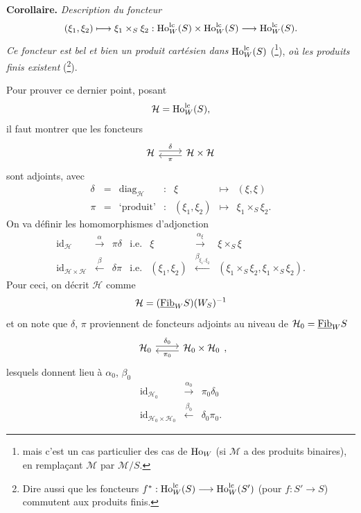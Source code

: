 \textbf{Corollaire.} {\itshape Description du foncteur
\[
(\xi_1,\xi_2)\longmapsto\xi_1\times_S\xi_2 : \mathrm{Ho}^{\mathrm{lc}}_W(S)\times\mathrm{Ho}^{\mathrm{lc}}_W(S)\longrightarrow\mathrm{Ho}^{\mathrm{lc}}_W(S).
\]
Ce foncteur est bel et bien un produit cartésien dans} $\mathrm{Ho}^{\mathrm{lc}}_W(S)$ (\footnote{mais c'est un cas particulier des cas de $\mathrm{Ho}_W$ (si $\mathcal{M}$ a des produits binaires), en remplaçant $\mathcal{M}$ par $\mathcal{M}/S$.}), {\itshape où les produits finis existent} (\footnote{Dire aussi que les foncteurs $f^* : \mathrm{Ho}^{\mathrm{lc}}_W(S)\longrightarrow\mathrm{Ho}^{\mathrm{lc}}_W(S')$ (pour $f : S'\longrightarrow S$) commutent aux produits finis.}).

Pour prouver ce dernier point, posant
\[
\mathcal{H}=\mathrm{Ho}^{\mathrm{lc}}_W(S),
\]
il faut montrer que les foncteurs
\[
\begin{tikzcd}[ampersand replacement=\&]
\mathcal{H} \arrow[r, shift left, "\delta"] \& \mathcal{H}\times\mathcal{H} \arrow[l, shift left, "\pi"]
\end{tikzcd}
\]
sont adjoints, avec
\[
\begin{array}{rclcrcl}
\delta & = & \mathrm{diag}_{\mathcal{H}} & : & \xi & \longmapsto & (\xi,\xi)\\
\pi & = & \text{`produit'} & : & (\xi_1,\xi_2) & \longmapsto & \xi_1\times_S\xi_2.
\end{array}
\]
On va définir les homomorphismes d'adjonction
\[
\begin{array}{rcllrcl}
\mathrm{id}_{\mathcal{H}} & \xrightarrow{\alpha} & \pi\delta & \text{i.e.} & \xi & \xrightarrow{\alpha_\xi} & \xi\times_S\xi\\
\mathrm{id}_{\mathcal{H}\times\mathcal{H}} & \xleftarrow{\beta} & \delta\pi & \text{i.e.} & (\xi_1,\xi_2) & \xleftarrow{\beta_{\xi_1,\xi_2}} & (\xi_1\times_S\xi_2,\xi_1\times_S\xi_2).
\end{array}
\]
Pour ceci, on décrit $\mathcal{H}$ comme
\[
\mathcal{H}=(\underline{\mathrm{Fib}}_W S)(W_S)^{-1}
\]
et on note que $\delta$, $\pi$ proviennent de foncteurs adjoints au niveau de $\mathcal{H}_0=\underline{\mathrm{Fib}}_W S$
\[
\begin{tikzcd}[ampersand replacement=\&]
\mathcal{H}_0 \arrow[r, shift left, "\delta_0"] \& \mathcal{H}_0\times\mathcal{H}_0 \arrow[l, shift left, "\pi_0"]
\end{tikzcd},
\]
lesquels donnent lieu à $\alpha_0$, $\beta_0$
\[
\begin{array}{rcl}
\mathrm{id}_{\mathcal{H}_0} & \xrightarrow{\alpha_0} & \pi_0\delta_0\\
\mathrm{id}_{\mathcal{H}_0\times\mathcal{H}_0} & \xleftarrow{\beta_0} & \delta_0\pi_0.
\end{array}
\]

